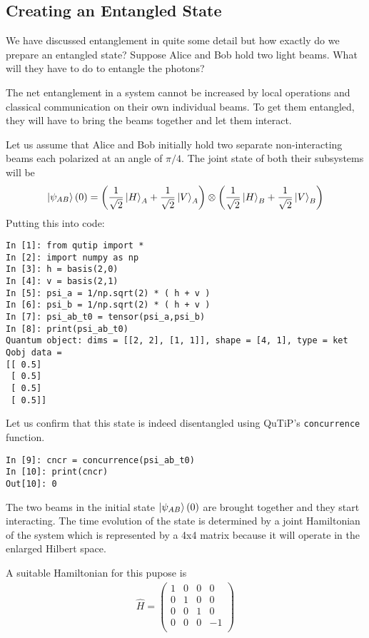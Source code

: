 \subsection{Creating an Entangled State}
We have discussed entanglement in quite some detail but how exactly do we prepare an entangled state? Suppose Alice and Bob hold two light beams. What will they have to do to entangle the photons?
\par The net entanglement in a system cannot be increased by local operations and classical communication on their own individual beams. To get them entangled, they will have to bring the beams together and let them interact.
\par Let us assume that Alice and Bob initially hold two separate non-interacting beams each polarized at an angle of $\pi/4$. The joint state of both their subsystems will be
\begin{align*}
\ket{\psi_{AB}}(0) &= \left( \frac{1}{\sqrt{2}} \ket{H}_A + \frac{1}{\sqrt{2}} \ket{V}_A \right) \otimes \left( \frac{1}{\sqrt{2}} \ket{H}_B + \frac{1}{\sqrt{2}} \ket{V}_B \right) \\
\end{align*}
Putting this into code:
\begin{verbatim}
In [1]: from qutip import *
In [2]: import numpy as np
In [3]: h = basis(2,0)
In [4]: v = basis(2,1)
In [5]: psi_a = 1/np.sqrt(2) * ( h + v )
In [6]: psi_b = 1/np.sqrt(2) * ( h + v )
In [7]: psi_ab_t0 = tensor(psi_a,psi_b)
In [8]: print(psi_ab_t0)
Quantum object: dims = [[2, 2], [1, 1]], shape = [4, 1], type = ket
Qobj data =
[[ 0.5]
 [ 0.5]
 [ 0.5]
 [ 0.5]]
\end{verbatim}
Let us confirm that this state is indeed disentangled using QuTiP's \texttt{concurrence} function.
\begin{verbatim}
In [9]: cncr = concurrence(psi_ab_t0)
In [10]: print(cncr)
Out[10]: 0
\end{verbatim}
\par The two beams in the initial state $\ket{\psi_{AB}}(0)$ are brought together and they start interacting. The time evolution of the state is determined by a joint Hamiltonian of the system which is represented by a 4x4 matrix because it will operate in the enlarged Hilbert space.
\par A suitable Hamiltonian for this pupose is
\begin{align*}
\hat{H} = \begin{pmatrix} 1 & 0 & 0 & 0 \\ 0 & 1 & 0 & 0 \\ 0 & 0 & 1 & 0 \\ 0 & 0 & 0 & -1 \\ \end{pmatrix}
\end{align*}
